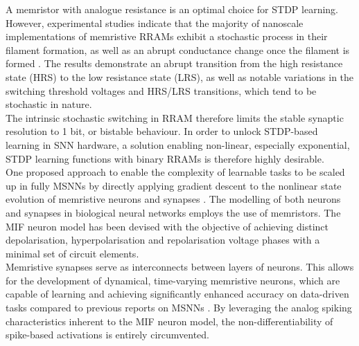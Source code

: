 \noindent A memristor with analogue resistance is an optimal choice for STDP learning. However, experimental studies indicate that the majority of nanoscale implementations of memristive RRAMs exhibit a stochastic process in their filament formation, as well as an abrupt conductance change once the filament is formed \cite{prakash2016multilevel}. The results demonstrate an abrupt transition from the high resistance state (HRS) to the low resistance state (LRS), as well as notable variations in the switching threshold voltages and HRS/LRS transitions, which tend to be stochastic in nature.\\

\noindent The intrinsic stochastic switching in RRAM therefore limits the stable synaptic resolution to 1 bit, or bistable behaviour. In order to unlock STDP-based learning in SNN hardware, a solution enabling non-linear, especially exponential, STDP learning functions with binary RRAMs is therefore highly desirable. \\

\noindent One proposed approach to enable the complexity of learnable tasks to be scaled up in fully MSNNs by directly applying gradient descent to the nonlinear state evolution of memristive neurons and synapses \cite{zhou2022memristive}. The modelling of both neurons and synapses in biological neural networks employs the use of memristors. The MIF neuron model has been devised with the objective of achieving distinct depolarisation, hyperpolarisation and repolarisation voltage phases with a minimal set of circuit elements. \\

\noindent Memristive synapses serve as interconnects between layers of neurons. This allows for the development of dynamical, time-varying memristive neurons, which are capable of learning and achieving significantly enhanced accuracy on data-driven tasks compared to previous reports on MSNNs \cite{neftci2019surrogate}. By leveraging the analog spiking characteristics inherent to the MIF neuron model, the non-differentiability of spike-based activations is entirely circumvented.\\

